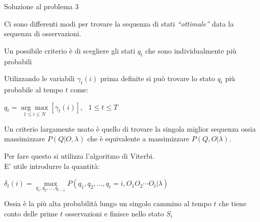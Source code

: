 \documentclass[slidestop,mathserif,red]{beamer}
\begin{document}
\begin{frame}{Soluzione al problema 3}
\begin{block}{}
Ci sono differenti modi per trovare la sequenza di stati \textit{``ottimale''} data la sequenza di osservazioni.
\end{block}

\begin{block}{}
Un possibile criterio \`e di scegliere gli stati $q_{t}$ che sono individualmente pi\`u probabili 
\end{block}

\begin{block}{}
Utilizzando le variabili $\gamma_{t}(i)$ prima definite si pu\`o trovare lo stato $q_{t}$ pi\`u probabile al tempo $t$ come:
\begin{center}
	$q_{t}=\underset{1 \leq i \leq N}{\arg\max}[\gamma_{t}(i)],\ \ \ 1\leq t \leq T$
\end{center}
\end{block}

\end{frame}


\begin{frame}
\begin{block}{}
Un criterio largamente usato \`e quello di trovare la singola miglior sequenza ossia massimizzare $P(Q|O,\lambda)$ che \`e equivalente a massimizzare $P(Q,O|\lambda)$.
\end{block}

\begin{block}{}
Per fare questo si utilizza l'algoritmo di Viterbi.\\
E' utile introdurre la quantit\`a: 
\begin{center}
$\delta_{t}(i) = \underset{q_{1},q_{2},\ldots,q_{t-1}}{\max}P(q_{1},q_{2},\ldots,q_{t}=i,O_{1}O_{2}\cdots O_{t}|\lambda)$
\end{center}
Ossia \`e la pi\`u alta probabilit\`a lungo un singolo cammino al tempo $t$ che tiene conto delle prime $t$ osservazioni e finisce nello stato $S_{i}$
\end{block}

\end{frame}
\end{document}
